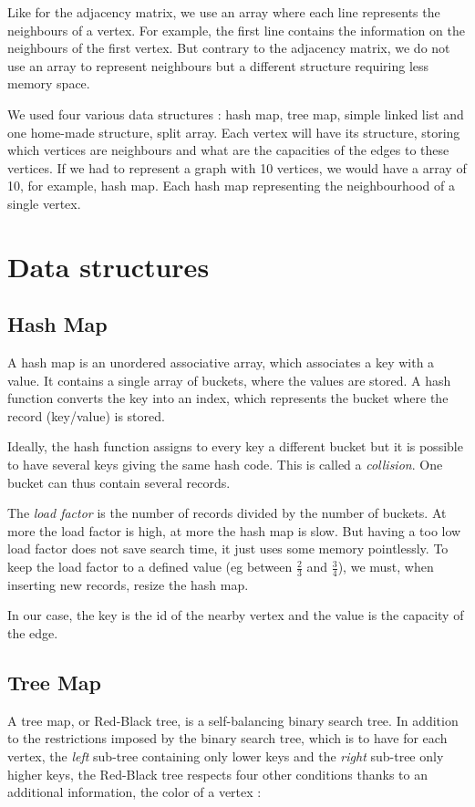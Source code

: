 Like for the adjacency matrix, we use an array where each line represents the neighbours of a vertex. For example, the first line contains the information on the neighbours of the first vertex. But contrary to the adjacency matrix, we do not use an array to represent neighbours but a different structure requiring less memory space. \newline

We used four various data structures : hash map, tree map, simple linked list and one home-made structure, split array. Each vertex will have its structure, storing which vertices are neighbours and what are the capacities of the edges to these vertices. If we had to represent a graph with 10 vertices, we would have a array of 10, for example, hash map. Each hash map representing the neighbourhood of a single vertex.

\section{Data structures}
\subsection{Hash Map}
A hash map is an unordered associative array, which associates a key with a value. It contains a single array of buckets, where the values are stored. A hash function converts the key into an index, which represents the bucket where the record (key/value) is stored. \newline

Ideally, the hash function assigns to every key a different bucket but it is possible to have several keys giving the same hash code. This is called a \textit{collision}. One bucket can thus contain several records. \newline

The \textit{load factor} is the number of records divided by the number of buckets.  At more the load factor is high, at more the hash map is slow. But having a too low load factor does not save search time, it just uses some memory pointlessly. To keep the load factor to a defined value (eg between $\frac{2}{3}$ and $\frac{3}{4}$), we must, when inserting new records, resize the hash map. \newline

In our case, the key is the id of the nearby vertex and the value is the capacity of the edge.

\subsection{Tree Map}
A tree map, or Red-Black tree, is a self-balancing binary search tree. In addition to the restrictions imposed by the binary search tree, which is to have for each vertex, the \textit{left} sub-tree containing only lower keys and the \textit{right} sub-tree only higher keys, the Red-Black tree respects four other conditions thanks to an additional information, the color of a vertex :

